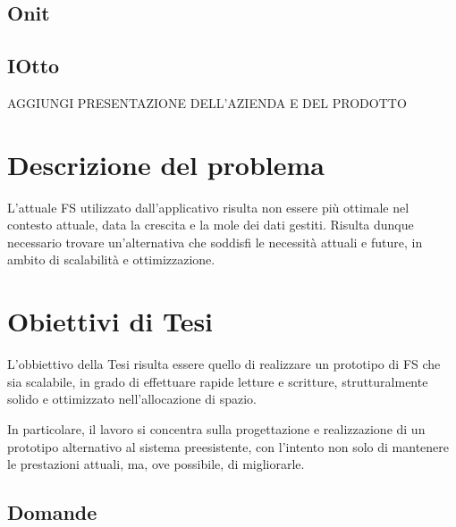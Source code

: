 \documentclass[12pt,a4paper,openright,twoside]{book}
\begin{document}
        \subsection{Onit}
        \subsection{IOtto}

        AGGIUNGI PRESENTAZIONE DELL'AZIENDA E DEL PRODOTTO

    \section{Descrizione del problema}

        L'attuale \ac{FS} utilizzato dall'applicativo risulta non essere più ottimale nel contesto attuale, data la crescita e la mole dei dati gestiti.
        Risulta dunque necessario trovare un'alternativa che soddisfi le necessità attuali e future, in ambito di scalabilità e ottimizzazione.

    \section{Obiettivi di Tesi}

        L'obbiettivo della Tesi risulta essere quello di realizzare un prototipo di \ac{FS} che sia scalabile, in grado di effettuare rapide letture e scritture, strutturalmente solido e ottimizzato nell'allocazione di spazio.

        In particolare, il lavoro si concentra sulla progettazione e realizzazione di un prototipo alternativo al sistema preesistente, con l'intento non solo di mantenere le prestazioni attuali, ma, ove possibile, di migliorarle.

        \subsection{Domande}
        \label{subsec:Domande}
\end{document}
